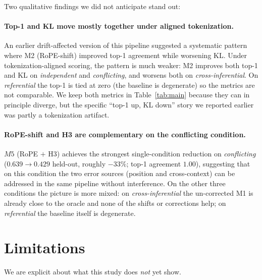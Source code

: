 \documentclass[11pt]{article}
\begin{document}
Two qualitative findings we did not anticipate stand out:

\paragraph{Top-1 and KL move mostly together under aligned tokenization.} An earlier drift-affected version of this pipeline suggested a systematic pattern where M2 (RoPE-shift) improved top-1 agreement while worsening KL. Under tokenization-aligned scoring, the pattern is much weaker: M2 improves both top-1 and KL on \emph{independent} and \emph{conflicting}, and worsens both on \emph{cross-inferential}. On \emph{referential} the top-1 is tied at zero (the baseline is degenerate) so the metrics are not comparable. We keep both metrics in Table~\ref{tab:main} because they can in principle diverge, but the specific ``top-1 up, KL down'' story we reported earlier was partly a tokenization artifact.

\paragraph{RoPE-shift and H3 are complementary on the conflicting condition.} $M5$ (RoPE $+$ H3) achieves the strongest single-condition reduction on \emph{conflicting} ($0.639 \to 0.429$ held-out, roughly $-33\%$; top-1 agreement $1.00$), suggesting that on this condition the two error sources (position and cross-context) can be addressed in the same pipeline without interference. On the other three conditions the picture is more mixed: on \emph{cross-inferential} the un-corrected M1 is already close to the oracle and none of the shifts or corrections help; on \emph{referential} the baseline itself is degenerate.

\section{Limitations}

We are explicit about what this study does \emph{not} yet show.
\end{document}
